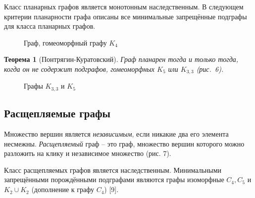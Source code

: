 \documentclass[12pt]{article}
\newtheorem{theorem}{\hspace{1cm}Теорема}
\begin{document}
Класс планарных графов является монотонным наследственным. В следующем критерии планарности графа описаны все минимальные запрещённые подграфы для класса планарных графов.

\begin{figure}
	\label{pic5}
	\caption{Граф, гомеоморфный графу $K_4$}
\end{figure}

\begin{theorem}[Понтрягин-Куратовский]
	\label{t4}
Граф планарен тогда и только тогда, когда он не содержит подграфов, гомеоморфных $K_5$ или ${K_{3,3}}$ (рис.~6).
\end{theorem} 

\begin{figure}
	\label{pic6}
	\caption{Графы $K_{3,3}$ и $K_5$}
\end{figure}
\vspace{-5mm}
\subsection{Расщепляемые графы}
Множество вершин является {\it независимым}, если никакие два его элемента несмежны.
{\it Расщепляемый} граф -- это граф, множество вершин которого можно разложить на клику и независимое множество (рис. 7).

Класс расщепляемых графов является наследственным. Минимальными запрещёнными порождёнными подграфами являются графы изоморфные $C_4, C_5$ и $K_2 \cup K_2$ (дополнение к графу $C_4$) [9].
\end{document}
